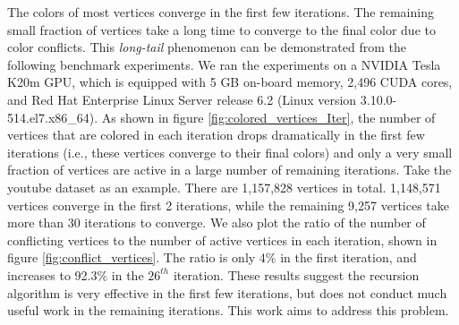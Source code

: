 The colors of most vertices converge in the first few iterations. The remaining small fraction of vertices take a long time to converge to the final color due to color conflicts. This \textit{long-tail} 
phenomenon can be demonstrated from the following benchmark experiments. We ran the experiments on a NVIDIA Tesla K20m GPU, which is equipped with 5 GB on-board memory, 2,496 CUDA 
cores, and Red Hat Enterprise Linux Server release 6.2 (Linux version 3.10.0-514.el7.x86\_64). 
As shown in figure \ref{fig:colored_vertices_Iter}, the number of vertices that are colored in each iteration drops dramatically in the first few iterations (i.e., these vertices converge to their final colors) and only a very small fraction of vertices are active in a large number of remaining iterations. Take the youtube dataset as an example. There are 1,157,828 vertices in total. 1,148,571 vertices converge in the first 2 iterations, while the remaining 9,257 vertices take more than 30 iterations to converge. We also plot the ratio of the number of conflicting vertices to the number of active vertices in each iteration, shown in figure \ref{fig:conflict_vertices}. The ratio is only 4\% in the first iteration, and increases to 92.3\% in the $26^{th}$ iteration. These results suggest the recursion algorithm is very effective in the first few iterations, but does not conduct much useful work in the remaining iterations. This work aims to address this problem. 


